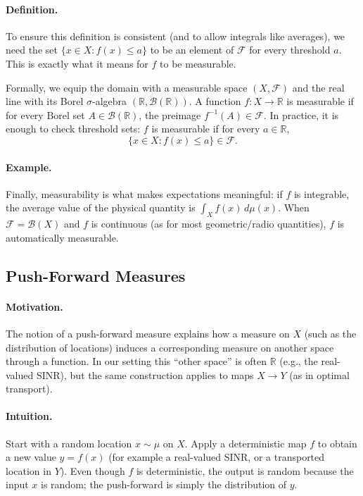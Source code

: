 \paragraph{Definition.}
To ensure this definition is consistent (and to allow integrals like averages), we need the set
$\{x\in X : f(x)\le a\}$ to be an element of $\mathcal{F}$ for every threshold $a$.
This is exactly what it means for $f$ to be measurable.

Formally, we equip the domain with a measurable space $(X,\mathcal{F})$ and the real line with
its Borel $\sigma$-algebra $(\mathbb{R},\mathcal{B}(\mathbb{R}))$.
A function $f:X\to\mathbb{R}$ is measurable if for every Borel set $A\in\mathcal{B}(\mathbb{R})$,
the preimage $f^{-1}(A)\in\mathcal{F}$.
In practice, it is enough to check threshold sets: $f$ is measurable if for every $a\in\mathbb{R}$,
$$
\{x\in X : f(x)\le a\}\in\mathcal{F}.
$$

\paragraph{Example.}
Finally, measurability is what makes expectations meaningful: if $f$ is integrable,
the average value of the physical quantity is $\int_X f(x)\,d\mu(x)$.
When $\mathcal{F}=\mathcal{B}(X)$ and $f$ is continuous (as for most geometric/radio quantities),
$f$ is automatically measurable.

\subsection{Push-Forward Measures}
\paragraph{Motivation.}
The notion of a push-forward measure explains how a measure on $X$ (such as the distribution of locations)
induces a corresponding measure on another space through a function. In our setting this ``other space'' is often
$\mathbb{R}$ (e.g., the real-valued SINR), but the same construction applies to maps $X\to Y$ (as in optimal transport).

\paragraph{Intuition.}
Start with a random location $x\sim \mu$ on $X$. Apply a deterministic map $f$ to obtain a new value $y=f(x)$
(for example a real-valued SINR, or a transported location in $Y$). Even though $f$ is deterministic, the output is
random because the input $x$ is random; the push-forward is simply the distribution of $y$.

